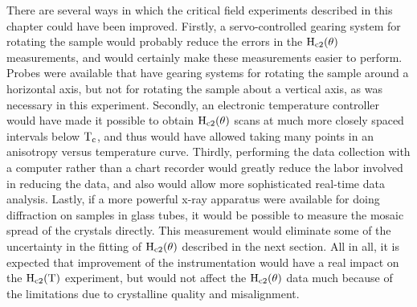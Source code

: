 	There  are   several ways in  which  the critical field experiments
described  in this  chapter    could  have  been  improved.   Firstly,    a
servo-controlled gearing  system for  rotating   the sample  would probably
reduce   the errors  in  the $\rm  H_{c2}(\theta)$  measurements, and would
certainly make these measurements easier to perform.  Probes were available
that have gearing systems for rotating the sample around a horizontal axis,
but not for rotating the sample about a  vertical axis, as was necessary in
this experiment.  Secondly, an electronic temperature controller would have
made it possible to obtain $\rm H_{c2}(\theta)$  scans at much more closely
spaced intervals below $\rm  T_c$, and thus would have  allowed taking many
points in an anisotropy  versus temperature curve.  Thirdly, performing the
data collection with a computer rather than a chart recorder  would greatly
reduce the labor involved in reducing  the data, and also would  allow more
sophisticated real-time  data analysis.  Lastly,  if  a more powerful x-ray
apparatus were  available for doing  diffraction on samples in glass tubes,
it would be possible to measure the mosaic spread of the crystals directly.
This measurement would eliminate some of the  uncertainty in the fitting of
$\rm  H_{c2}(\theta)$ described  in  the next  section.   All in all, it is
expected that  improvement of the  instrumentation would have a real impact
on  the  $\rm H_{c2}(T)$   experiment,  but  would not   affect   the  $\rm
H_{c2}(\theta)$ data  much because  of  the limitations due to  crystalline
quality and misalignment.
